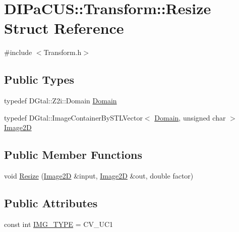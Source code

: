 \hypertarget{structDIPaCUS_1_1Transform_1_1Resize}{}\section{D\+I\+Pa\+C\+US\+:\+:Transform\+:\+:Resize Struct Reference}
\label{structDIPaCUS_1_1Transform_1_1Resize}


{\ttfamily \#include $<$Transform.\+h$>$}

\subsection*{Public Types}
\begin{DoxyCompactItemize}
\item 
typedef D\+Gtal\+::\+Z2i\+::\+Domain \mbox{\hyperlink{structDIPaCUS_1_1Transform_1_1Resize_ae3f578e82510c6343d4fd876853382ed}{Domain}}
\item 
typedef D\+Gtal\+::\+Image\+Container\+By\+S\+T\+L\+Vector$<$ \mbox{\hyperlink{structDIPaCUS_1_1Transform_1_1Resize_ae3f578e82510c6343d4fd876853382ed}{Domain}}, unsigned char $>$ \mbox{\hyperlink{structDIPaCUS_1_1Transform_1_1Resize_a0e4548850b3aed5dd86283f0c4f38fee}{Image2D}}
\end{DoxyCompactItemize}
\subsection*{Public Member Functions}
\begin{DoxyCompactItemize}
\item 
void \mbox{\hyperlink{structDIPaCUS_1_1Transform_1_1Resize_abb9e745e06fbbbf8cda3c0a0e56dfb41}{Resize}} (\mbox{\hyperlink{structDIPaCUS_1_1Transform_1_1Resize_a0e4548850b3aed5dd86283f0c4f38fee}{Image2D}} \&input, \mbox{\hyperlink{structDIPaCUS_1_1Transform_1_1Resize_a0e4548850b3aed5dd86283f0c4f38fee}{Image2D}} \&out, double factor)
\end{DoxyCompactItemize}
\subsection*{Public Attributes}
\begin{DoxyCompactItemize}
\item 
const int \mbox{\hyperlink{structDIPaCUS_1_1Transform_1_1Resize_a94f6df88ddb94760235b92da8580b1d8}{I\+M\+G\+\_\+\+T\+Y\+PE}} = C\+V\+\_\+U\+C1
\end{DoxyCompactItemize}



